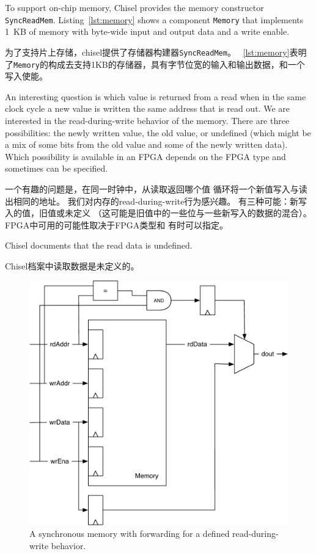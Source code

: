 \documentclass[%
    10pt,
    headinclude, footexclude,
    openright, %
    notitlepage,
    cleardoubleempty,
    headsepline,
    pointlessnumbers,
    bibtotoc, idxtotoc,
    ]{scrbook}
\newcommand{\code}[1]{{\small{\texttt{#1}}}}
\newcommand{\scale}{0.7}
\begin{document}
To support on-chip memory, Chisel provides the memory constructor \code{SyncReadMem}.
Listing~\ref{lst:memory} shows a component \code{Memory} that implements
1~KB of memory with byte-wide input and output data and a write enable.

为了支持片上存储，chisel提供了存储器构建器\code{SyncReadMem}。
~\ref{lst:memory}表明了\code{Memory}的构成去支持1KB的存储器，具有字节位宽的输入和输出数据，和一个写入使能。


An interesting question is which value is returned from a read when in the same clock
cycle a new value is written the same address that is read out.
We are interested in the read-during-write behavior of the memory.
There are three possibilities: the newly written value, the old value, or undefined
(which might be a mix of some bits from the old value and some of the newly written data).
Which possibility is available in an FPGA depends on the FPGA type and
sometimes can be specified.

一个有趣的问题是，在同一时钟中，从读取返回哪个值
循环将一个新值写入与读出相同的地址。
我们对内存的read-during-write行为感兴趣。
有三种可能：新写入的值，旧值或未定义
（这可能是旧值中的一些位与一些新写入的数据的混合）。
FPGA中可用的可能性取决于FPGA类型和
有时可以指定。

Chisel documents that the read data is undefined.

Chisel档案中读取数据是未定义的。

\begin{figure}
  \centering
  \includegraphics[scale=\scale]{figures/memory-forwarding}
  \caption{A synchronous memory with forwarding for a defined read-during-write behavior.}
  \label{fig:memory:forwarding}
\end{figure}
\end{document}
